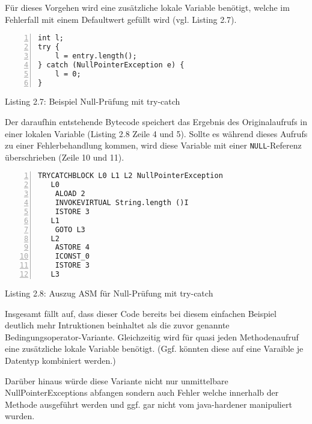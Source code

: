 Für dieses Vorgehen wird eine zusätzliche lokale Variable benötigt,
welche im Fehlerfall mit einem Defaultwert gefüllt wird (vgl. Listing 2.7).

\begin{lstlisting}[basicstyle=\ttfamily,numbers=left,numberstyle=\footnotesize\ttfamily,backgroundcolor=\color{source}]
int l;
try {
	l = entry.length();
} catch (NullPointerException e) {
	l = 0;
}
\end{lstlisting}
\centerline{Listing 2.7: Beispiel Null-Prüfung mit try-catch}

\vspace{0.3cm}

Der daraufhin entstehende Bytecode speichert das Ergebnis des Originalaufrufs
in einer lokalen Variable (Listing 2.8 Zeile 4 und 5). Sollte es während
dieses Aufrufs zu einer Fehlerbehandlung kommen, wird diese Variable mit
einer \texttt{NULL}-Referenz überschrieben (Zeile 10 und 11).


\begin{lstlisting}[basicstyle=\ttfamily,numbers=left,numberstyle=\footnotesize\ttfamily,backgroundcolor=\color{source}]
    TRYCATCHBLOCK L0 L1 L2 NullPointerException
   L0
    ALOAD 2
    INVOKEVIRTUAL String.length ()I
    ISTORE 3
   L1
    GOTO L3
   L2
    ASTORE 4
    ICONST_0
    ISTORE 3
   L3
\end{lstlisting}
\centerline{Listing 2.8: Auszug ASM für Null-Prüfung mit try-catch}

\vspace{0.3cm}

Insgesamt fällt auf, dass dieser Code bereits bei diesem einfachen Beispiel deutlich
mehr Intruktionen beinhaltet als die zuvor genannte Bedingungsoperator-Variante.
Gleichzeitig wird für quasi jeden Methodenaufruf eine zusätzliche lokale Variable
benötigt. (Ggf. könnten diese auf eine Varaible je Datentyp kombiniert werden.)

Darüber hinaus würde diese Variante nicht nur unmittelbare NullPointerExceptions
abfangen sondern auch Fehler welche innerhalb der Methode ausgeführt werden und
ggf. gar nicht vom java-hardener manipuliert wurden.

